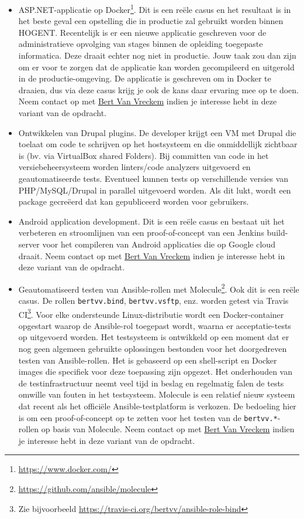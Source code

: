\begin{itemize}
  \item ASP.NET-applicatie op Docker\footnote{\url{https://www.docker.com/}}. Dit is een reële casus en het resultaat is in het beste geval een opstelling die in productie zal gebruikt worden binnen HOGENT. Recentelijk is er een nieuwe applicatie geschreven voor de administratieve opvolging van stages binnen de opleiding toegepaste informatica. Deze draait echter nog niet in productie. Jouw taak zou dan zijn om er voor te zorgen dat de applicatie kan worden gecompileerd en uitgerold in de productie-omgeving. De applicatie is geschreven om in Docker te draaien, dus via deze casus krijg je ook de kans daar ervaring mee op te doen. Neem contact op met \href{mailto:bert.vanvreckem@hogent.be}{Bert Van Vreckem} indien je interesse hebt in deze variant van de opdracht.
  
  \item Ontwikkelen van Drupal plugins. De developer krijgt een VM met Drupal die toelaat om code te schrijven op het hostsysteem en die onmiddellijk zichtbaar is (bv. via VirtualBox shared Folders). Bij committen van code in het versiebeheersysteem worden linters/code analyzers uitgevoerd en geautomatiseerde tests. Eventueel kunnen tests op verschillende versies van PHP/MySQL/Drupal in parallel uitgevoerd worden. Als dit lukt, wordt een package gecreëerd dat kan gepubliceerd worden voor gebruikers.
  
  \item Android application development. Dit is een reële casus en bestaat uit het verbeteren en stroomlijnen van een proof-of-concept van een Jenkins build-server voor het compileren van Android applicaties die op Google cloud draait. Neem contact op met \href{mailto:bert.vanvreckem@hogent.be}{Bert Van Vreckem} indien je interesse hebt in deze variant van de opdracht.
  
  \item Geautomatiseerd testen van Ansible-rollen met Molecule\footnote{\url{https://github.com/ansible/molecule}}. Ook dit is een reële casus. De rollen \texttt{bertvv.bind}, \texttt{bertvv.vsftp}, enz. worden getest via Travis CI\footnote{Zie bijvoorbeeld \url{https://travis-ci.org/bertvv/ansible-role-bind}}. Voor elke ondersteunde Linux-distributie wordt een Docker-container opgestart waarop de Ansible-rol toegepast wordt, waarna er acceptatie-tests op uitgevoerd worden. Het testsysteem is ontwikkeld op een moment dat er nog geen algemeen gebruikte oplossingen bestonden voor het doorgedreven testen van Ansible-rollen. Het is gebaseerd op een shell-script en Docker images die specifiek voor deze toepassing zijn opgezet. Het onderhouden van de testinfrastructuur neemt veel tijd in beslag en regelmatig falen de tests omwille van fouten in het testsysteem. Molecule is een relatief nieuw systeem dat recent als het officiële Ansible-testplatform is verkozen. De bedoeling hier is om een proof-of-concept op te zetten voor het testen van de \texttt{bertvv.*}-rollen op basis van Molecule. Neem contact op met \href{mailto:bert.vanvreckem@hogent.be}{Bert Van Vreckem} indien je interesse hebt in deze variant van de opdracht.
\end{itemize}

